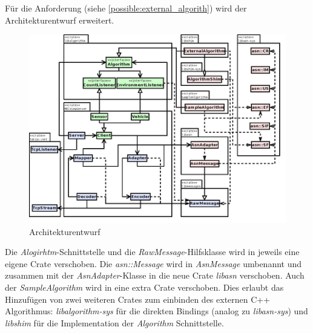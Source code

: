 Für die Anforderung  (siehe \autoref{possible:external_algorith}) wird der Architekturentwurf erweitert.

\begin{figure}[H]
	\centering
	\includegraphics[width=3.3\textwidth]{dia/architecture_v2}
	\caption{Architekturentwurf}
	\label{draft:architecture_v2}
\end{figure}

Die \textit{Alogirhtm}-Schnittstelle und die \textit{RawMessage}-Hilfsklasse wird in jeweils eine eigene Crate verschoben. 
Die \textit{asn::Message} wird in \textit{AsnMessage} umbenannt und zusammen mit der \textit{AsnAdapter}-Klasse in die neue Crate \textit{libasn} verschoben.
Auch der \textit{SampleAlgorithm} wird in eine extra Crate verschoben.
Dies erlaubt das Hinzufügen von zwei weiteren Crates zum einbinden des externen C++ Algorithmus: \textit{libalgorithm-sys} für die direkten Bindings (analog zu \textit{libasn-sys}) und \textit{libshim} für die Implementation der \textit{Algorithm} Schnittstelle.

